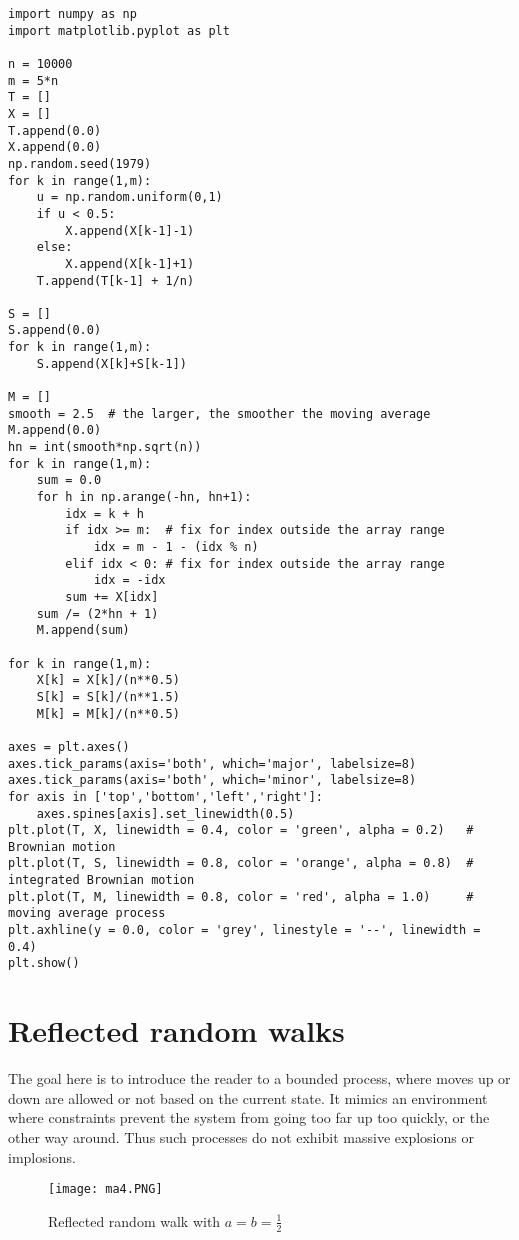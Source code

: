 \documentclass[oneside,10pt]{book}
\begin{document}
\begin{lstlisting}
import numpy as np
import matplotlib.pyplot as plt

n = 10000
m = 5*n
T = []
X = []
T.append(0.0)
X.append(0.0)
np.random.seed(1979)
for k in range(1,m):
    u = np.random.uniform(0,1)
    if u < 0.5:
        X.append(X[k-1]-1)
    else:
        X.append(X[k-1]+1)
    T.append(T[k-1] + 1/n)

S = []
S.append(0.0)
for k in range(1,m):
    S.append(X[k]+S[k-1])

M = []
smooth = 2.5  # the larger, the smoother the moving average
M.append(0.0)
hn = int(smooth*np.sqrt(n))
for k in range(1,m):
    sum = 0.0
    for h in np.arange(-hn, hn+1):
        idx = k + h
        if idx >= m:  # fix for index outside the array range
            idx = m - 1 - (idx % n)
        elif idx < 0: # fix for index outside the array range
            idx = -idx
        sum += X[idx]
    sum /= (2*hn + 1)
    M.append(sum)

for k in range(1,m):
    X[k] = X[k]/(n**0.5)
    S[k] = S[k]/(n**1.5)
    M[k] = M[k]/(n**0.5)

axes = plt.axes()
axes.tick_params(axis='both', which='major', labelsize=8)
axes.tick_params(axis='both', which='minor', labelsize=8)
for axis in ['top','bottom','left','right']:
    axes.spines[axis].set_linewidth(0.5) 
plt.plot(T, X, linewidth = 0.4, color = 'green', alpha = 0.2)   # Brownian motion
plt.plot(T, S, linewidth = 0.8, color = 'orange', alpha = 0.8)  # integrated Brownian motion
plt.plot(T, M, linewidth = 0.8, color = 'red', alpha = 1.0)     # moving average process
plt.axhline(y = 0.0, color = 'grey', linestyle = '--', linewidth = 0.4)
plt.show()
\end{lstlisting}

\section{Reflected random walks}\label{rflectr}

The goal here is to introduce the reader to a bounded process, where moves up or down are allowed or not based on the current state. It mimics an environment where constraints prevent the system from going too far up too quickly, or the other way around. Thus such processes do not exhibit massive explosions or implosions. 

\begin{figure}%
\centering
\texttt{[image: ma4.PNG]} %
\caption{Reflected random walk with $a=b=\frac{1}{2}$}
\label{fig:ivf}
\end{figure}
\end{document}

